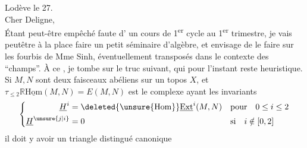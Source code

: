 
\noindent\hfill Lodève le 27.\\
Cher Deligne,\\
Étant peut-être empêché  faute d' un cours de 1\textsuperscript{er} cycle au 1\textsuperscript{er} trimestre, je vais peutêtre à la place faire un petit séminaire d'algèbre, et envisage de le faire sur les fourbis de Mme Sinh, éventuellement transposés dans le contexte des ``champs''. À ce , je tombe sur le truc suivant, qui pour l'instant reste heuristique. Si $M,N$ sont deux faisceaux abéliens sur un topos $X$, et $\tau_{\leq 2}\mathbb{R}\underline{\mathrm{Hom}}(M,N)=E(M,N)$ est le complexe ayant les invariants
\[
\left\{\begin{aligned}
\underline{H}^{i} &= \deleted{\unsure{\mathrm{Hom}}}\underline{\mathrm{Ext}}^{i}(M,N) && \text{pour}\quad 0\leq i\leq 2\\
\underline{H}^{\unsure{j|i}} &= 0 && \text{si}\quad i\notin[0,2]
\end{aligned}\right.
\]
il doit y avoir un triangle distingué canonique


